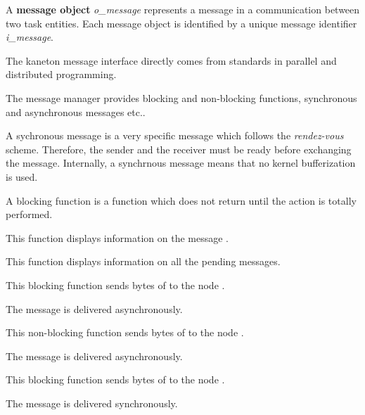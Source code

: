 A \textbf{message object} \textit{o\_message} represents a message in a
communication between two task entities. Each message object is identified
by a unique message identifier \textit{i\_message}.

The kaneton message interface directly comes from standards in parallel
and distributed programming.

The message manager provides blocking and non-blocking functions,
synchronous and asynchronous messages etc..

A sychronous message is a very specific message which follows the
\textit{rendez-vous} scheme. Therefore, the sender and the receiver
must be ready before exchanging the message. Internally, a synchrnous
message means that no kernel bufferization is used.

A blocking function is a function which does not return until the
action is totally performed.

%
%

	 {
	   This function displays information on the message .
	 }

	 {
	   This function displays information on all the pending messages.
	 }

	 {
	   This blocking function sends  bytes of
	    to the node .

	   The message is delivered asynchronously.
	 }

	 {
	   This non-blocking function sends  bytes of
	    to the node .

	   The message is delivered asynchronously.
	 }

	 {
	   This blocking function sends  bytes of
	    to the node .

	   The message is delivered synchronously.
	 }

